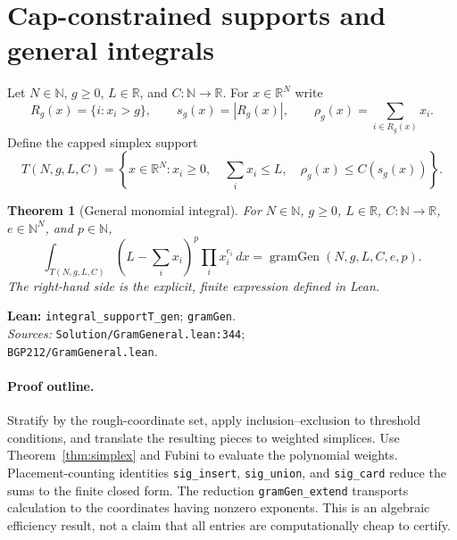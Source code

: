 \documentclass[11pt]{article}
\newtheorem{theorem}{Theorem}[section]
\newcommand{\R}{\mathbb{R}}
\newcommand{\N}{\mathbb{N}}
\newcommand{\gram}{\operatorname{gramGen}}
\newcommand{\code}[1]{\texttt{#1}}
\begin{document}
\section{Cap-constrained supports and general integrals}
Let $N\in\N$, $g\ge0$, $L\in\R$, and $C:\N\to\R$. For $x\in\R^N$ write
\[
 R_g(x)=\{i:x_i>g\},\qquad s_g(x)=|R_g(x)|,\qquad
 \rho_g(x)=\sum_{i\in R_g(x)}x_i.
\]
Define the capped simplex support
\begin{equation}\label{eq:support}
 T(N,g,L,C)=\left\{x\in\R^N:x_i\ge0,\quad
 \sum_i x_i\le L,\quad \rho_g(x)\le C(s_g(x))\right\}.
\end{equation}
\begin{theorem}[General monomial integral]\label{thm:general}
For $N\in\N$, $g\ge0$, $L\in\R$, $C:\N\to\R$, $e\in\N^N$, and $p\in\N$,
\begin{equation}\label{eq:gram}
 \int_{T(N,g,L,C)}\left(L-\sum_i x_i\right)^p
 \prod_i x_i^{e_i}\,dx
 =\gram(N,g,L,C,e,p).
\end{equation}
The right-hand side is the explicit, finite expression defined in Lean.
\end{theorem}
\noindent\textbf{Lean:} \code{integral\_supportT\_gen}; \code{gramGen}.\\
\textit{Sources:} \nolinkurl{Solution/GramGeneral.lean:344};\\
\nolinkurl{BGP212/GramGeneral.lean}.

\paragraph{Proof outline.}
Stratify by the rough-coordinate set, apply inclusion--exclusion to threshold
conditions, and translate the resulting pieces to weighted simplices. Use
Theorem~\ref{thm:simplex} and Fubini to evaluate the polynomial weights.
Placement-counting identities \code{sig\_insert}, \code{sig\_union}, and
\code{sig\_card} reduce the sums to the finite closed form. The reduction
\code{gramGen\_extend} transports calculation to the coordinates having nonzero
exponents. This is an algebraic efficiency result, not a claim that all entries are
computationally cheap to certify.
\end{document}
